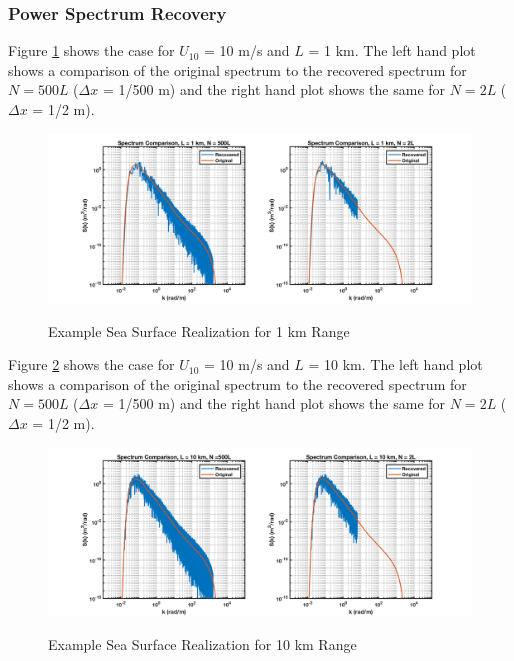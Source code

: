 \subsubsection{Power Spectrum Recovery}
Figure \ref{os_fig:7bbb} shows the case for $U_{10}$ = 10 m/s and $L$ = 1 km. The left hand plot shows a comparison of the original spectrum to the recovered spectrum for $N = 500L$ ($\Delta x$ = 1/500 m) and the right hand plot shows the same for $N=2L$ ($\Delta x$ = 1/2 m).
\begin{figure}[H]
  \begin{center}
\includegraphics[width=6in]{../media/Ocean_Surface/sea_surface_spectra_1000.png}
  \end{center}
  \renewcommand{\baselinestretch}{1} \small\normalsize
  \begin{quote}
    \caption[Example Sea Surface Realization for 1 km Range]{Example Sea Surface Realization for 1 km Range\label{os_fig:7bbb}}
  \end{quote}
\end{figure}
\renewcommand{\baselinestretch}{2} \small\normalsize

Figure \ref{os_fig:7aaa} shows the case for $U_{10}$ = 10 m/s and $L$ = 10 km. The left hand plot shows a comparison of the original spectrum to the recovered spectrum for $N = 500L$ ($\Delta x$ = 1/500 m) and the right hand plot shows the same for $N=2L$ ($\Delta x$ = 1/2 m).
\begin{figure}[H]
  \begin{center}
\includegraphics[width=6in]{../media/Ocean_Surface/sea_surface_spectra_10000.png}
  \end{center}
  \renewcommand{\baselinestretch}{1} \small\normalsize
  \begin{quote}
    \caption[Example Sea Surface Realization for 10 km Range]{Example Sea Surface Realization for 10 km Range\label{os_fig:7aaa}}
  \end{quote}
\end{figure}
\renewcommand{\baselinestretch}{2} \small\normalsize

